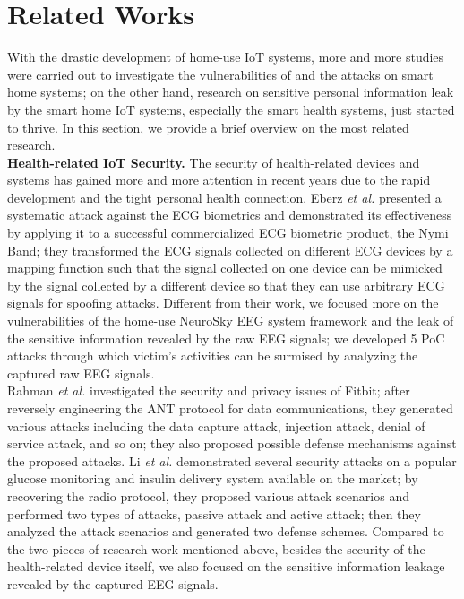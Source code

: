 \section{Related Works}
\label{sec:related}
With the drastic development of home-use IoT systems, more and more studies were carried out to investigate the vulnerabilities of and the attacks on smart home systems; on the other hand, research on sensitive personal information leak by the smart home IoT systems, especially the smart health systems, just started to thrive. In this section, we provide a brief overview on the most related research.\\
%
\indent \textbf{Health-related IoT Security.}
The security of health-related devices and systems has gained more and more attention in recent years due to the rapid development and the tight personal health connection. Eberz \emph{et al.} \cite{eberz2017broken} presented a systematic attack against the ECG biometrics and demonstrated its effectiveness by applying it to a successful commercialized ECG biometric product, the Nymi Band; they transformed the ECG signals collected on different ECG devices by a mapping function such that the signal collected on one device can be mimicked by the signal collected by a different device so that they can use arbitrary ECG signals for spoofing attacks. Different from their work, we focused more on the vulnerabilities of the home-use NeuroSky EEG system framework and the leak of the sensitive information revealed by the raw EEG signals; we developed 5 PoC attacks through which victim's activities can be surmised by analyzing the captured raw EEG signals.\\
\indent Rahman \emph{et al.} \cite{rahman2013fit} investigated the security and privacy issues of Fitbit; after reversely engineering the ANT protocol for data communications, they generated various attacks including the data capture attack, injection attack, denial of service attack, and so on; they also proposed possible defense mechanisms against the proposed attacks. Li \emph{et al.} \cite{li2011hijacking} demonstrated several security attacks on a popular glucose monitoring and insulin delivery system available on the market; by recovering the radio protocol, they proposed various attack scenarios and performed two types of attacks, passive attack and active attack; then they analyzed the attack scenarios and generated two defense schemes. Compared to the two pieces of research work mentioned above, besides the security of the health-related device itself, we also focused on the sensitive information leakage revealed by the captured EEG signals.\\
